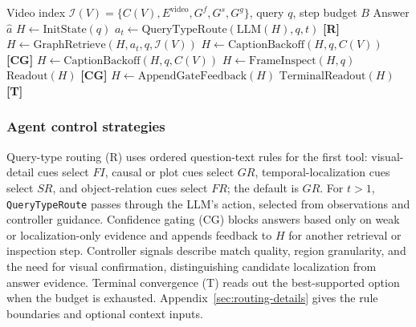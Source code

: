 \documentclass[11pt]{article}
\begin{document}
\begin{algorithm}[!tb]
  \caption{SGDAgent reasoning loop with control strategies: query-type routing (R), confidence gating (CG), and terminal convergence (T).}
  \label{alg:search}
  \begin{algorithmic}[1]
  \footnotesize
  \REQUIRE Video index $\mathcal{I}(V)=\{C(V),E^{\mathrm{video}},G^f,G^s,G^g\}$, query $q$, step budget $B$
  \ENSURE Answer $\hat{a}$
  \STATE $H \leftarrow \mathrm{InitState}(q)$
      \STATE $a_t \leftarrow \mathrm{QueryTypeRoute}(\mathrm{LLM}(H),q,t)$
        \hfill \textcolor{blue!60!black}{\small\textbf{[R]}}
          \STATE $H \leftarrow \mathrm{GraphRetrieve}(H,a_t,q,\mathcal{I}(V))$
              \STATE $H \leftarrow \mathrm{CaptionBackoff}(H,q,C(V))$
                \hfill \textcolor{blue!60!black}{\small\textbf{[CG]}}
          \ENDIF
          \STATE $H \leftarrow \mathrm{CaptionBackoff}(H,q,C(V))$
          \STATE $H \leftarrow \mathrm{FrameInspect}(H,q)$
          \RETURN $\mathrm{Readout}(H)$
            \hfill \textcolor{blue!60!black}{\small\textbf{[CG]}}
          \STATE $H \leftarrow \mathrm{AppendGateFeedback}(H)$
      \ENDIF
  \ENDFOR
  \RETURN $\mathrm{TerminalReadout}(H)$
    \hfill \textcolor{blue!60!black}{\small\textbf{[T]}}
  \end{algorithmic}
\end{algorithm}


\subsubsection{Agent control strategies}
Query-type routing (R) uses ordered question-text rules for the first tool: visual-detail cues select $FI$, causal or plot cues select $GR$, temporal-localization cues select $SR$, and object-relation cues select $FR$; the default is $GR$.
For $t>1$, \texttt{QueryTypeRoute} passes through the LLM's action, selected from observations and controller guidance.
Confidence gating (CG) blocks answers based only on weak or localization-only evidence and appends feedback to $H$ for another retrieval or inspection step.
Controller signals describe match quality, region granularity, and the need for visual confirmation, distinguishing candidate localization from answer evidence.
Terminal convergence (T) reads out the best-supported option when the budget is exhausted.
Appendix~\ref{sec:routing-details} gives the rule boundaries and optional context inputs.
\end{document}

